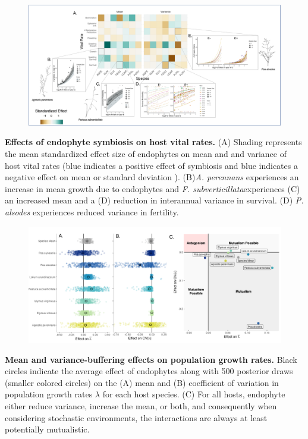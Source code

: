 \documentclass[12pt]{article}
\begin{document}
\clearpage


\begin{figure}
	\centering
	\includegraphics[width=\linewidth]{StochDemo_fig1.png}
\end{figure}
 \textbf{Effects of endophyte symbiosis on host vital rates.} (A) Shading represents the mean standardized effect size of endophytes on mean and and variance of host vital rates (blue indicates a positive effect of symbiosis and blue indicates a negative effect on mean or standard deviation ). (B)\emph{A. perennans} experiences an increase in mean growth due to endophytes and \emph{F. subverticillata}experiences  (C) an increased mean and a (D) reduction in interannual variance in survival. (D) \emph{P. alsodes} experiences reduced variance in fertility.
\newpage

\begin{figure}
	\centering
	\includegraphics[width=\linewidth]{StochDemo_fig2.png}
\end{figure}
 \textbf{Mean and variance-buffering effects on population growth rates.} Black circles indicate the average effect of endophytes along with 500 posterior draws (smaller colored circles) on the (A) mean and (B) coefficient of variation in population growth rates $\lambda$ for each host species. (C) For all hosts, endophyte either reduce variance, increase the mean, or both, and consequently when considering stochastic environments, the interactions are always at least potentially mutualistic.
\newpage
\end{document}
